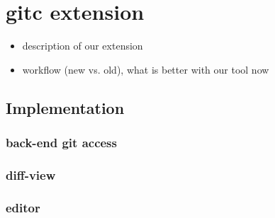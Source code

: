 \section{gitc extension}
\label{sec:Extension}

\begin{itemize}
	\item description of our extension
	\item workflow (new vs. old), what is better with our tool now
\end{itemize}

\subsection{Implementation}

\subsubsection{back-end git access}

\subsubsection{diff-view}

\subsubsection{editor}